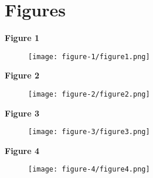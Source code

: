 \documentclass[12pt, twoside, letterpaper]{article}
\begin{document}


\newpage

\section*{Figures}

\textbf{Figure 1}
\begin{figure}[ht]
  \texttt{[image: figure-1/figure1.png]}
\end{figure}
\newpage

\textbf{Figure 2}
\begin{figure}[ht]
  \texttt{[image: figure-2/figure2.png]}
\end{figure}
\newpage

\textbf{Figure 3}
\begin{figure}[ht]
  \texttt{[image: figure-3/figure3.png]}
\end{figure}
\newpage

\textbf{Figure 4}
\begin{figure}[ht]
  \texttt{[image: figure-4/figure4.png]}
\end{figure}
\newpage
\end{document}
